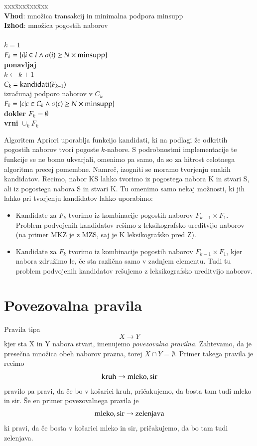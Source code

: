 \begin{tabbing}
xxx\=xxx\=xxx\=xxx \kill\\
{\bf Vhod}: množica transakcij in minimalna podpora minsupp \\
{\bf Izhod}: množica pogostih naborov \\
\\
$k=1$ \\
$F_k=\{i|i\in I\land\sigma(i)\geq N\times{\rm minsupp}\}$ \\
{\bf ponavljaj} \\
\> $k\leftarrow k+1$ \\
\> $C_k={\rm kandidati}(F_{k-1})$ \\
\> izračunaj podporo naborov v $C_k$ \\
\> $F_k=\{c | c\in C_k\land\sigma(c)\geq N\times{\rm minsupp}\}$ \\
{\bf dokler} $F_k=\emptyset$ \\
{\bf vrni} $\cup_k F_k$ \\
\end{tabbing}

Algoritem Apriori uporablja funkcijo kandidati, ki na podlagi že odkritih pogostih naborov tvori pogoste $k$-nabore. S podrobnostmi implementacije te funkcije se ne bomo ukvarjali, omenimo pa samo, da so za hitrost celotnega algoritma precej pomembne. Namreč, izogniti se moramo tvorjenju enakih kandidatov. Recimo, nabor KS lahko tvorimo iz pogostega nabora K in stvari S, ali iz pogostega nabora S in stvari K. Tu omenimo samo nekaj možnosti, ki jih lahko pri tvorjenju kandidatov lahko uporabimo:
\begin{itemize}
\item Kandidate za $F_k$ tvorimo iz kombinacije pogostih naborov $F_{k-1}\times F_1$. Problem podvojenih kandidatov rešimo z leksikografsko ureditvijo naborov (na primer MKZ je z MZS, saj je K leksikografsko pred Z).
\item Kandidate za $F_k$ tvorimo iz kombinacije pogostih naborov $F_{k-1}\times F_1$, kjer nabora združimo le, če sta različna samo v zadnjem elementu. Tudi tu problem podvojenih kandidatov rešujemo z leksikografsko ureditvijo naborov.
\end{itemize}

\section{Povezovalna pravila}

Pravila tipa
$$ X\rightarrow Y $$
kjer sta X in Y nabora stvari, imenujemo {\em povezovalna pravilna}. Zahtevamo, da je presečna množica obeh naborov prazna, torej $X\cap Y=\emptyset$. Primer takega pravila je recimo
$$ {\rm kruh}\to {\rm mleko}, {\rm sir}$$
pravilo pa pravi, da če bo v košarici kruh, pričakujemo, da bosta tam tudi mleko in sir. Še en primer povezovalnega pravila je
$$ {\rm mleko}, {\rm sir}\to {\rm zelenjava} $$
ki pravi, da če bosta v košarici mleko in sir, pričakujemo, da bo tam tudi zelenjava.

